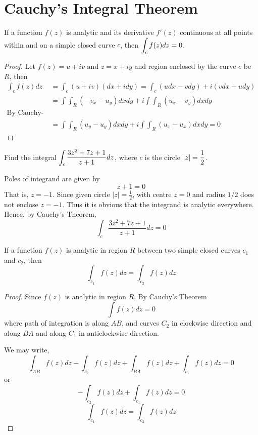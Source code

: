 \section{Cauchy's Integral Theorem}
\begin{theorem}
If a function $f(z)$ is analytic and its derivative $f'(z)$ continuous at all points within and on a simple closed curve $c$, then $\displaystyle \int_c f(z) dz = 0$.
\end{theorem}
\begin{proof}
Let $f(z)=u+iv$ and $z=x+iy$ and region enclosed by the curve $c$ be $R$, then
\begin{align*}
	\int_cf(z)dz 	&= \int_c(u+iv)(dx+idy) =  \int_c(udx-vdy) + i(vdx+udy)\\
								&= \int\int_R (-v_x - u_y)dxdy + i\int\int_R (u_x - v_y)dxdy\\
								\text{By Cauchy-Riemann equations,} \\
								&= \int\int_R (u_y - u_y)dxdy + i\int\int_R (u_x - u_x)dxdy =0
\end{align*}
\end{proof}
\begin{example}
Find the integral $\displaystyle \int_c \frac{3z^2+7z+1}{z+1}dz$, where $c$ is the circle $\displaystyle |z|=\frac{1}{2}$.
\end{example}
\begin{solution}
Poles of integrand are given by
$$z+1 = 0$$
That is, $z=-1$. Since given circle $|z|=\frac{1}{2}$, with centre $z=0$ and radius $1/2$ does not enclose $z=-1$. Thus it is obvious that the integrand is analytic everywhere. Hence, by Cauchy's Theorem,
\[\int_c \frac{3z^2+7z+1}{z+1}dz = 0\]
\end{solution}
\begin{theorem}
If a function $f(z)$ is analytic in region $R$ between two simple closed curves $c_1$ and $c_2$, then
\[\int_{c_1} f(z) dz = \int_{c_2} f(z) dz\]
\end{theorem}
\begin{proof}
Since $f(z)$ is analytic in region $R$, By Cauchy's Theorem
\[\int f(z) dz = 0\]
where path of integration is along $AB$, and curves $C_2$ in clockwise direction and along $BA$ and along $C_1$ in anticlockwise direction.

We may write,
\[\int_{AB} f(z) dz - \int_{c_2} f(z) dz + \int_{BA} f(z) dz + \int_{c_1} f(z) dz = 0\]
or
\[- \int_{c_2} f(z) dz +  \int_{c_1} f(z) dz = 0\]
\[ \int_{c_1} f(z) dz =  \int_{c_2} f(z) dz \]
\end{proof}
